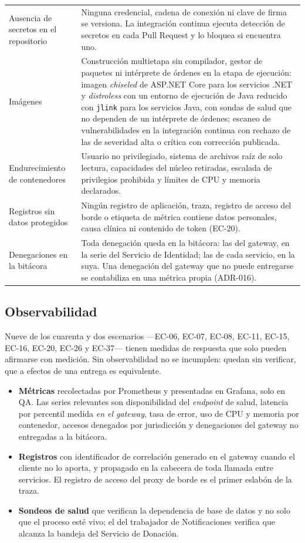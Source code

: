 \documentclass[11pt,a4paper]{article}
\begin{document}
\begin{longtable}{L{3.6cm} L{11.0cm}}
Ausencia de secretos en el repositorio & Ninguna credencial, cadena de conexión ni clave de firma se versiona. La integración continua ejecuta detección de secretos en cada Pull Request y lo bloquea si encuentra uno. \\
Imágenes & Construcción multietapa sin compilador, gestor de paquetes ni intérprete de órdenes en la etapa de ejecución: imagen \emph{chiseled} de ASP.NET Core para los servicios .NET y \emph{distroless} con un entorno de ejecución de Java reducido con \texttt{jlink} para los servicios Java, con sondas de salud que no dependen de un intérprete de órdenes; escaneo de vulnerabilidades en la integración continua con rechazo de las de severidad alta o crítica con corrección publicada. \\
Endurecimiento de contenedores & Usuario no privilegiado, sistema de archivos raíz de solo lectura, capacidades del núcleo retiradas, escalada de privilegios prohibida y límites de CPU y memoria declarados. \\
Registros sin datos protegidos & Ningún registro de aplicación, traza, registro de acceso del borde o etiqueta de métrica contiene datos personales, causa clínica ni contenido de token (EC-20). \\
Denegaciones en la bitácora & Toda denegación queda en la bitácora: las del gateway, en la serie del Servicio de Identidad; las de cada servicio, en la suya. Una denegación del gateway que no puede entregarse se contabiliza en una métrica propia (ADR-016). \\
\end{longtable}

\subsection{Observabilidad}

Nueve de los cuarenta y dos escenarios ---EC-06, EC-07, EC-08, EC-11, EC-15, EC-16, EC-20, EC-26 y EC-37--- tienen medidas de respuesta que solo pueden afirmarse con medición. Sin observabilidad no se incumplen: quedan sin verificar, que a efectos de una entrega es equivalente.

\begin{itemize}
\item \textbf{Métricas} recolectadas por Prometheus y presentadas en Grafana, solo en QA. Las series relevantes son disponibilidad del \emph{endpoint} de salud, latencia por percentil medida \emph{en el gateway}, tasa de error, uso de CPU y memoria por contenedor, accesos denegados por jurisdicción y denegaciones del gateway no entregadas a la bitácora.
\item \textbf{Registros} con identificador de correlación generado en el gateway cuando el cliente no lo aporta, y propagado en la cabecera de toda llamada entre servicios. El registro de acceso del proxy de borde es el primer eslabón de la traza.
\item \textbf{Sondeos de salud} que verifican la dependencia de base de datos y no solo que el proceso esté vivo; el del trabajador de Notificaciones verifica que alcanza la bandeja del Servicio de Donación.
\end{itemize}
\end{document}
